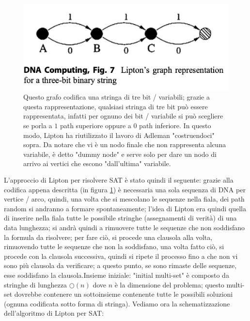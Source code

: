 \documentclass[12pt,a4paper]{report}
\begin{document}
\begin{figure}[h]
	\centering
	\includegraphics[width=0.5\linewidth]{img/lipton three bit}
	\caption{Questo grafo codifica una stringa di tre bit / variabili; grazie a questa rappresentazione, qualsiasi stringa di tre bit può essere rappresentata, infatti per ognuno dei bit / variabile si può scegliere se porla a $1$ path superiore oppure a $0$ path inferiore. In questo modo, Lipton ha riutilizzato il lavoro di Adleman "costruendoci" sopra. Da notare che vi è un nodo finale che non rappresenta alcuna variabile, è detto "dummy node" e serve solo per dare un nodo di arrivo ai vertici che escono "dall'ultima" variabile.}
	\label{fig:2}
\end{figure}
L'approccio di Lipton per risolvere SAT è stato quindi il seguente: grazie alla codifica appena descritta (in figura \ref{fig:2}) è necessaria una sola sequenza di DNA per vertice / arco, quindi, una volta che si mescolano le sequenze nella fiala, dei path random si andranno a formare spontaneamente; l'idea di Lipton era quindi quella di inserire nella fiala tutte le possibile stringhe (assegnamenti di verità) di una data lunghezza; si andrà quindi a rimuovere tutte le sequenze che non soddisfano la formula da risolvere; per fare ciò, si procede una clausola alla volta, rimuovendo tutte le sequenze che non la soddisfano, una volta fatto ciò, si procede con la clausola successiva, quindi si ripete il processo fino a che non vi sono più clausola da verificare; a questo punto, se sono rimaste delle sequenze, esse soddisfano la clausola.Insieme iniziale: "initial multi-set" è composto da stringhe di lunghezza $\bigcirc(n)$ dove $n$ è la dimensione del problema; questo multi-set dovrebbe contenere un sottoinsieme contenente tutte le possibili soluzioni (ognuna codificata sotto forma di stringa). Vediamo ora la schematizzazione dell'algoritmo di Lipton per SAT:
\end{document}
